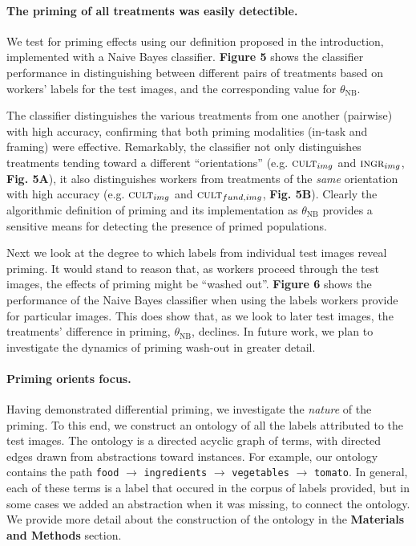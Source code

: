 \documentclass[a4paper]{report}
\begin{document}
\paragraph{The priming of all treatments was easily detectible.}
We test for priming effects using our definition proposed in the introduction,
implemented with a Naive Bayes classifier.  \textbf{Figure 5} shows
the classifier performance in distinguishing between different pairs of 
treatments based on workers' labels for the test images, and the corresponding
value for $\theta_\text{NB}$.

The classifier distinguishes the various treatments from one another (pairwise)
with high accuracy, confirming that both priming modalities 
(in-task and framing) were effective.  Remarkably, the classifier not only 
distinguishes treatments tending toward a different ``orientations'' 
(e.g. $\textsc{cult}_{img}$ and $\textsc{ingr}_{img}$, \textbf{Fig. 5A}), 
it also distinguishes workers from treatments of the \textit{same} 
orientation with high accuracy 
(e.g. $\textsc{cult}_{img}$ and $\textsc{cult}_{fund, img}$, \textbf{Fig. 5B}).
Clearly the algorithmic definition of priming and its implementation as 
$\theta_\text{NB}$ provides a sensitive means for detecting the presence of
primed populations. 

Next we look at the degree to which labels from individual test images reveal 
priming.  It would stand to reason that, as workers proceed through 
the test images, the effects of priming might be ``washed out''.  
\textbf{Figure 6} shows the
performance of the Naive Bayes classifier when using the labels workers provide
for particular images.  This does show that, as we look to later test images, 
the treatments' difference in priming, $\theta_\text{NB}$, declines.  In future
work, we plan to investigate the dynamics of priming wash-out in greater 
detail.

\paragraph{Priming orients focus.} Having demonstrated differential 
priming, we investigate the \textit{nature} of the priming.  To this
end, we construct an ontology of all the labels attributed to
the test images.  The ontology is a directed acyclic graph of terms,
with directed edges drawn from abstractions toward instances.  For example,
our ontology contains the path \texttt{food} $\to$ \texttt{ingredients} $\to$ 
\texttt{vegetables} 
$\to$ \texttt{tomato}.  In general, each of these terms is a label that
occured in the corpus of labels provided, but in some cases we added 
an abstraction when it was missing, to connect the ontology.  We provide more
detail about the construction of the ontology in the 
\textbf{Materials and Methods} section.
\end{document}
